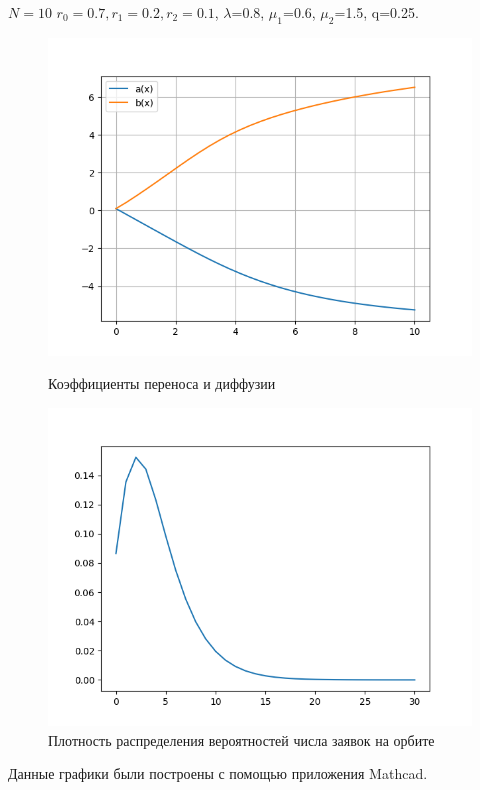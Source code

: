 $N=10$ $r_{0}=0.7, r_{1}=0.2, r_{2}=0.1$, $\lambda$=0.8, $\mu_{1}$=0.6, $\mu_{2}$=1.5, q=0.25.
\begin{figure}[H]
	\centering
	\begin{minipage}[h]{0.49\linewidth}
		\includegraphics[width=0.8\linewidth]{ab10} 	
		\caption{Коэффициенты переноса и диффузии}
		\label{ris:experimoriginal}
	\end{minipage}
	\hfill
	\begin{minipage}[h]{0.49\linewidth}
		\includegraphics[width=0.8\linewidth]{P10} 
		\caption{Плотность распределения вероятностей числа заявок на орбите}
		\label{ris:experimcoded}
	\end{minipage}
\end{figure}

Данные графики были построены с помощью приложения Mathcad.
